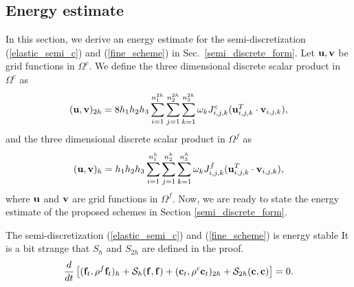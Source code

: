 \subsection{Energy estimate}\label{sec_energy}
In this section, we derive an energy estimate for the semi-discretization (\ref{elastic_semi_c}) and (\ref{fine_scheme}) in Sec.~\ref{semi_discrete_form}. Let ${\bf u}, {\bf v}$ be grid functions in $\Omega^c$. We define the three dimensional discrete scalar product in $\Omega^c$ as
\begin{equation}\label{scalar_product_inner}
({\bf u}, {\bf v})_{2h} = 8h_1h_2h_3\sum_{i=1}^{n_1^{2h}}\sum_{j=1}^{n_2^{2h}}\sum_{k=1}^{n_3^{2h}}\omega_k{J}_{i,j,k}^{c}({\bf u}_{i,j,k}^T\cdot {\bf v}_{i,j,k}),
\end{equation}
and the three dimensional discrete scalar product in $\Omega^f$ as
\begin{equation}\label{scalar_product_inner_f}
({\bf u}, {\bf v})_{h} = h_1h_2h_3\sum_{i=1}^{n_1^{h}}\sum_{j=1}^{n_2^{h}}\sum_{k=1}^{n_3^{h}}\omega_k{J}_{i,j,k}^{f}({\bf u}_{i,j,k}^T\cdot {\bf v}_{i,j,k}),
\end{equation}
where $\bf u$ and $\bf v$ are grid functions in $\Omega^f$. Now, we are ready to state the energy estimate of the proposed schemes in Section \ref{semi_discrete_form}. 
 \begin{theorem}\label{thm1}
  The semi-discretization (\ref{elastic_semi_c}) and (\ref{fine_scheme}) is energy stable {\color{red}It is a bit strange that $S_h$ and $S_{2h}$ are defined in the proof.}
  \[
  \frac{d}{dt}\left[({\bf f}_t,\rho^f {\bf f}_t)_{h} + \mathcal{S}_{h}({\bf f},{\bf f}) + ({\bf c}_t,\rho^{c} {\bf c}_t)_{2h} + \mathcal{S}_{2h}({\bf c},{\bf c}) \right]   = 0.
  \]
 \end{theorem}
